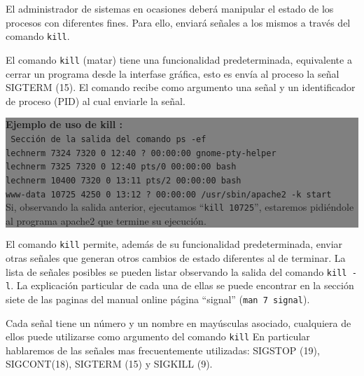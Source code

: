 \documentclass[12pt]{article}
\begin{document}
El administrador de sistemas en ocasiones deberá manipular el estado de 
los procesos con diferentes fines. Para ello, enviará señales a los 
mismos a través del comando \texttt{kill}. 


El comando \texttt{kill} (matar) tiene una funcionalidad predeterminada, 
equivalente a cerrar un programa desde la interfase gráfica, esto es envía
al proceso la señal SIGTERM (15). El comando 
recibe como argumento una señal y un identificador de proceso (PID) al 
cual enviarle la señal. 

\colorbox{grey}{\parbox[t]{0.95\linewidth}{ \vspace*{0.5cm} { 
{\bf Ejemplo de uso de kill :} \\
{\tt
Sección de la salida del comando \texttt{ps -ef}\\
lechnerm  7324  7320  0 12:40 ?        00:00:00 gnome-pty-helper \\
lechnerm  7325  7320  0 12:40 pts/0    00:00:00 bash\\
lechnerm 10400  7320  0 13:11 pts/2    00:00:00 bash\\
www-data 10725  4250  0 13:12 ?        00:00:00 /usr/sbin/apache2 -k start \\
}
Si, observando la salida anterior, ejecutamos ``\texttt{kill 10725}'', 
estaremos pidiéndole al programa apache2 que termine su ejecución. 
} \vspace*{0.5cm} } } 
	
El comando \texttt{kill} permite, además de su funcionalidad predeterminada,
enviar otras señales que generan otros cambios de estado diferentes al de 
terminar. La lista de señales posibles se pueden listar observando la 
salida del comando \texttt{kill -l}. La explicación particular de cada 
una de ellas se puede encontrar en la sección siete de las paginas del 
manual online página ``signal'' (\texttt{man 7 signal}).  

Cada señal tiene un número y un nombre en mayúsculas asociado, cualquiera
de ellos puede utilizarse como argumento del comando \texttt{kill}  
En particular hablaremos de las señales mas frecuentemente utilizadas: 
SIGSTOP (19), SIGCONT(18), SIGTERM (15) y  SIGKILL (9).  
\end{document}
